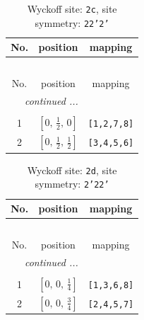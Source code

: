 \documentclass[fleqn,8pt]{jsarticle}
\begin{document}
\begin{longtable}{ccc}
\caption{Wyckoff site: {\tt 2c}, site symmetry: {\tt 22'2'}}
 \\
 \hline \hline
No. & position & mapping \\ \hline \endfirsthead

\multicolumn{2}{l}{\tablename\ \thetable{}} \\
 \hline \hline
No. & position & mapping \\ \hline \endhead

 \hline \hline
\multicolumn{2}{r}{\footnotesize\it continued ...} \\ \endfoot

 \hline \hline
\multicolumn{2}{r}{} \\ \endlastfoot

1 & $\left[ 0,\, \frac{1}{2},\, 0 \right]$ & {\tt [1,2,7,8]} \\ \hline
2 & $\left[ 0,\, \frac{1}{2},\, \frac{1}{2} \right]$ & {\tt [3,4,5,6]} \\
\end{longtable}
\renewcommand{\arraystretch}{1.2}
\begin{longtable}{ccc}
\caption{Wyckoff site: {\tt 2d}, site symmetry: {\tt 2'22'}}
 \\
 \hline \hline
No. & position & mapping \\ \hline \endfirsthead

\multicolumn{2}{l}{\tablename\ \thetable{}} \\
 \hline \hline
No. & position & mapping \\ \hline \endhead

 \hline \hline
\multicolumn{2}{r}{\footnotesize\it continued ...} \\ \endfoot

 \hline \hline
\multicolumn{2}{r}{} \\ \endlastfoot

1 & $\left[ 0,\, 0,\, \frac{1}{4} \right]$ & {\tt [1,3,6,8]} \\ \hline
2 & $\left[ 0,\, 0,\, \frac{3}{4} \right]$ & {\tt [2,4,5,7]} \\
\end{longtable}
\renewcommand{\arraystretch}{1.2}
\end{document}
